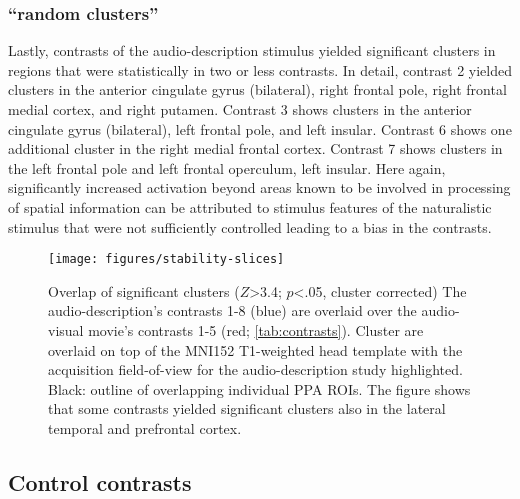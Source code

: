 \documentclass[english]{article}
\begin{document}
\subsubsection{``random clusters''}

%
Lastly, contrasts of the audio-description stimulus yielded significant clusters
in regions that were statistically in two or less contrasts.
In detail, contrast 2 yielded clusters in the anterior cingulate gyrus
(bilateral), right frontal pole, right frontal medial cortex, and right putamen.
Contrast 3 shows clusters in the anterior cingulate gyrus (bilateral), left
frontal pole, and left insular.
Contrast 6 shows one additional cluster in the right medial frontal cortex.
Contrast 7 shows clusters in the left frontal pole and left frontal operculum,
left insular.
Here again, significantly increased activation beyond areas known to be involved
in processing of spatial information can be attributed to stimulus features of
the naturalistic stimulus that were not sufficiently controlled leading to a
bias in the contrasts.
%


\begin{figure*}[tbp]
\centering
    \texttt{[image: figures/stability-slices]}
    \caption{Overlap of significant clusters ($Z$>3.4; $p$<.05, cluster corrected)
        The audio-description's contrasts 1-8 (blue)
        are overlaid over the audio-visual movie's contrasts 1-5 (red;
        \ref{tab:contrasts}).
        Cluster are overlaid on top of the MNI152 T1-weighted head template
        with the acquisition field-of-view for the audio-description study
        highlighted.
        Black: outline of overlapping individual PPA ROIs.
        The figure shows that some contrasts yielded significant clusters
        also in the lateral temporal and prefrontal cortex.
        }
    \label{fig:stability-slices}
\end{figure*}


\subsection{Control contrasts}

\end{document}
